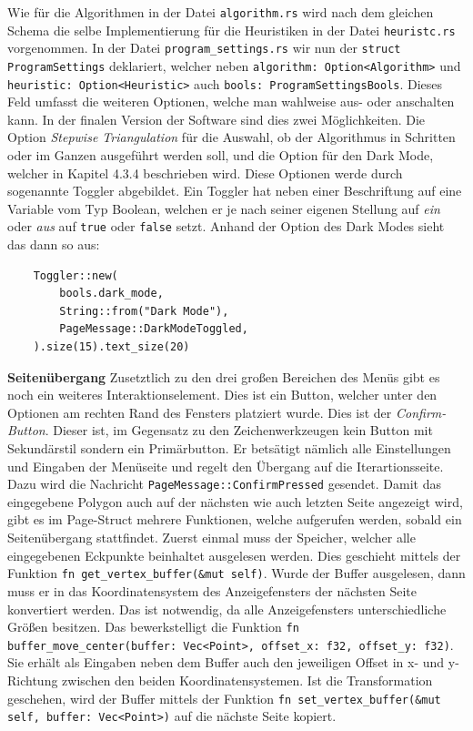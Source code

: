 Wie für die Algorithmen in der Datei \lstinline{algorithm.rs} wird nach dem gleichen Schema die selbe Implementierung für die Heuristiken in der Datei \lstinline{heuristc.rs} vorgenommen.
In der Datei \lstinline{program_settings.rs} wir nun der \lstinline{struct ProgramSettings} deklariert, welcher neben  \lstinline{algorithm: Option<Algorithm>} und \lstinline{heuristic: Option<Heuristic>}
auch \lstinline{bools: ProgramSettingsBools}. Dieses Feld umfasst die weiteren Optionen, welche man wahlweise aus- oder anschalten kann. In der finalen Version der Software sind dies zwei Möglichkeiten.
Die Option \emph{Stepwise Triangulation} für die Auswahl, ob der Algorithmus in Schritten oder im Ganzen ausgeführt werden soll, und die Option für den Dark Mode, welcher in Kapitel 4.3.4 beschrieben wird.
Diese Optionen werde durch sogenannte Toggler abgebildet. Ein Toggler hat neben einer Beschriftung auf eine Variable vom Typ Boolean, welchen er je nach seiner eigenen Stellung auf \emph{ein} oder \emph{aus} auf 
\lstinline{true} oder \lstinline{false} setzt. Anhand der Option des Dark Modes sieht das dann so aus:

\begin{lstlisting}
    Toggler::new(
        bools.dark_mode,
        String::from("Dark Mode"),
        PageMessage::DarkModeToggled,
    ).size(15).text_size(20)
\end{lstlisting}\pagebreak

\textbf{\large{Seitenübergang}}\linebreak
Zusetztlich zu den drei großen Bereichen des Menüs gibt es noch ein weiteres Interaktionselement. Dies ist ein Button, welcher unter den Optionen am rechten Rand des Fensters platziert wurde.
Dies ist der \emph{Confirm-Button}. Dieser ist, im Gegensatz zu den Zeichenwerkzeugen kein Button mit Sekundärstil sondern ein Primärbutton. Er betsätigt nämlich alle Einstellungen und Eingaben der Menüseite und
regelt den Übergang auf die Iterartionsseite. Dazu wird die Nachricht \lstinline{PageMessage::ConfirmPressed} gesendet. Damit das eingegebene Polygon auch auf der nächsten wie auch letzten Seite angezeigt wird, gibt es im Page-Struct
mehrere Funktionen, welche aufgerufen werden, sobald ein Seitenübergang stattfindet. Zuerst einmal muss der Speicher, welcher alle eingegebenen Eckpunkte beinhaltet ausgelesen werden. Dies geschieht mittels der Funktion 
\lstinline{fn get_vertex_buffer(&mut self)}. Wurde der Buffer ausgelesen, dann muss er in das Koordinatensystem des Anzeigefensters der nächsten Seite konvertiert werden. Das ist notwendig, da alle Anzeigefensters unterschiedliche Größen besitzen.
Das bewerkstelligt die Funktion \lstinline{fn buffer_move_center(buffer: Vec<Point>, offset_x: f32, offset_y: f32)}. Sie erhält als Eingaben neben dem Buffer auch den jeweiligen Offset in x- und y-Richtung
zwischen den beiden Koordinatensystemen. Ist die Transformation geschehen, wird der Buffer mittels der Funktion \lstinline{fn set_vertex_buffer(&mut self, buffer: Vec<Point>)} auf die nächste Seite kopiert.

